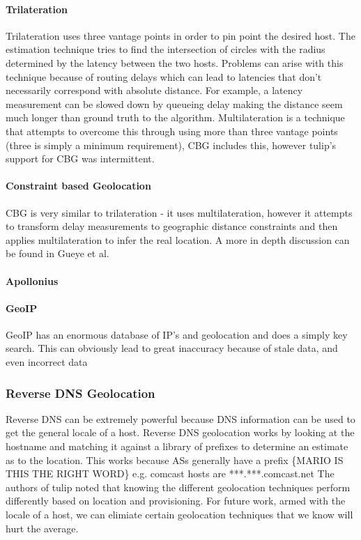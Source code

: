 \documentclass{acm_proc_article-sp}
\begin{document}
\paragraph{Trilateration}
Trilateration uses three vantage points in order to pin point the desired host. The estimation technique tries to find the intersection of 
circles with the radius determined by the latency between the two hosts. Problems can arise with this technique because of routing delays
which can lead to latencies that don't necessarily correspond with absolute distance. For example, a latency measurement can be slowed down by queueing delay
making the distance seem much longer than ground truth to the algorithm. Multilateration is a technique that attempts to overcome this through using more than three
vantage points (three is simply a minimum requirement), CBG includes this, however tulip's support for CBG was intermittent.
\paragraph{Constraint based Geolocation}
CBG is very similar to trilateration - it uses multilateration, however it attempts to transform delay measurements 
to geographic distance constraints and then applies multilateration to infer the real location. \cite{Gueye:2006}
A more in depth discussion can be found in Gueye et al. \cite{Gueye:2006}
\paragraph{Apollonius}
\paragraph{GeoIP}
GeoIP has an enormous database of IP's and geolocation and does a simply key search. This can obviously lead
to great inaccuracy because of stale data, and even incorrect data


\subsubsection{Reverse DNS Geolocation}
Reverse DNS can be extremely powerful because DNS information can be used to get the general locale of a host. \cite{Spring:2004}
Reverse DNS geolocation works by looking at the hostname and matching it against a library of prefixes to determine an estimate as to the 
location. This works because ASs generally have a prefix \{MARIO IS THIS THE RIGHT WORD\} e.g. comcast hosts are ***.***.comcast.net
The authors of tulip noted that knowing the different geolocation techniques perform differently based on location
and provisioning.\cite{TulipInfoComm} 
For future work, armed with the locale of a host, we can elimiate certain geolocation techniques that we know will hurt the average.
\end{document}
